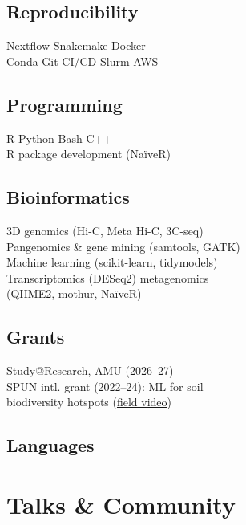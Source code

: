 \documentclass[]{deedy-resume-openfont}
\begin{document}
\begin{minipage}[t]{0.33\textwidth}
\subsection{Reproducibility}
Nextflow \textbullet{} Snakemake \textbullet{} Docker \\
Conda \textbullet{} Git \textbullet{} CI/CD \textbullet{} Slurm \textbullet{} AWS
\sectionsep

\subsection{Programming}
R \textbullet{} Python \textbullet{} Bash \textbullet{} C++ \\
R package development (NaïveR)
\sectionsep

\subsection{Bioinformatics}
3D genomics (Hi-C, Meta Hi-C, 3C-seq) \\
Pangenomics \& gene mining (samtools, GATK) \\
Machine learning (scikit-learn, tidymodels) \\
Transcriptomics (DESeq2) \textbullet{} metagenomics \\
(QIIME2, mothur, NaïveR)
\sectionsep

\subsection{Grants}
Study@Research, AMU (2026--27) \\
SPUN intl. grant (2022--24): ML for soil \\
biodiversity hotspots (\href{\MySpunVideoURL{}}{field video})
\sectionsep

\subsection{Languages}
\LanguagesStacked{}
\sectionsep



\section{Talks \& Community}


\end{minipage}
\end{document}
